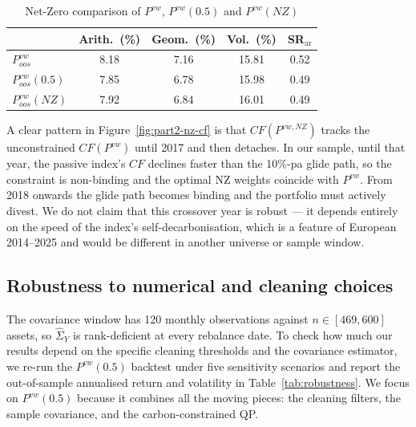 \documentclass[11pt,a4paper]{article}
\begin{document}
\begin{table}[H]
\centering
\caption{Net-Zero comparison of $P^{vw}$, $P^{vw}(0.5)$ and
$P^{vw}(NZ)$}\label{tab:42}
\small
\begin{tabular}{l S[table-format=2.2] S[table-format=2.2] S[table-format=2.2] S[table-format=1.2]}
\toprule
                       & {Arith.\ (\%)}  & {Geom.\ (\%)} & {Vol.\ (\%)} & {SR$_{\text{ar}}$} \\
\midrule
$P^{vw}_{oos}$         & 8.18            & 7.16          & 15.81        & 0.52       \\
$P^{vw}_{oos}(0.5)$    & 7.85            & 6.78          & 15.98        & 0.49       \\
$P^{vw}_{oos}(NZ)$     & 7.92            & 6.84          & 16.01        & 0.49       \\
\bottomrule
\end{tabular}
\end{table}


A clear pattern in Figure~\ref{fig:part2-nz-cf} is that
$CF(P^{vw,NZ})$ tracks the unconstrained $CF(P^{vw})$ until 2017 and
then detaches. In our sample, until that year, the passive index's
$CF$ declines faster than the 10\%-pa glide path, so the constraint is
non-binding and the optimal NZ weights coincide with $P^{vw}$. From
2018 onwards the glide path becomes binding and the portfolio must
actively divest. We do not claim that this crossover year is robust ---
it depends entirely on the speed of the index's self-decarbonisation,
which is a feature of European 2014--2025 and would be different in
another universe or sample window.

\subsection{Robustness to numerical and cleaning choices}\label{sec:robustness}

The covariance window has 120 monthly observations against
$n\in[469,600]$ assets, so $\widehat\Sigma_Y$ is rank-deficient at every
rebalance date. To check how much our results depend on the specific
cleaning thresholds and the covariance estimator, we re-run the
$P^{vw}(0.5)$ backtest under five sensitivity scenarios and report the
out-of-sample annualised return and volatility in
Table~\ref{tab:robustness}. We focus on $P^{vw}(0.5)$ because it
combines all the moving pieces: the cleaning filters, the sample
covariance, and the carbon-constrained QP.
\end{document}

